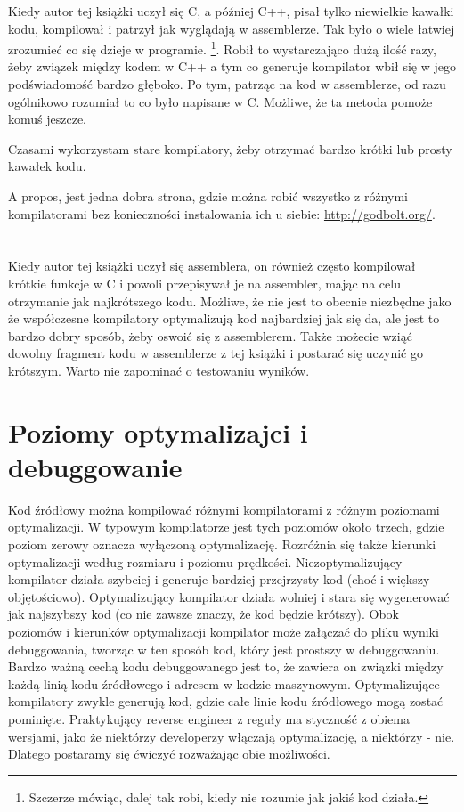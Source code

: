 
Kiedy autor tej książki uczył się C, a później C++, pisał tylko niewielkie kawałki kodu, kompilował i patrzył jak wyglądają w assemblerze. Tak było o wiele łatwiej zrozumieć co się dzieje w programie.%
\footnote{Szczerze mówiąc, dalej tak robi, kiedy nie rozumie jak jakiś kod działa.}.
Robił to wystarczająco dużą ilość razy, żeby związek między kodem w C++ a tym co generuje kompilator wbił się w jego podświadomość bardzo głęboko. Po tym, patrząc na kod w assemblerze, od razu ogólnikowo rozumiał to co było napisane w C. Możliwe, że ta metoda pomoże komuś jeszcze.


Czasami wykorzystam stare kompilatory, żeby otrzymać bardzo krótki lub prosty kawałek kodu.

A propos, jest jedna dobra strona, gdzie można robić wszystko z różnymi kompilatorami bez konieczności instalowania ich u siebie: \url{http://godbolt.org/}.

\section*{\Exercises}

Kiedy autor tej książki uczył się assemblera, on również często kompilował krótkie funkcje w C i powoli przepisywał je na assembler, mając na celu otrzymanie jak najkrótszego kodu. Możliwe, że nie jest to obecnie niezbędne jako że współczesne kompilatory optymalizują kod najbardziej jak się da, ale jest to bardzo dobry sposób, żeby oswoić się z assemblerem. Także możecie wziąć dowolny fragment kodu w assemblerze z tej książki i postarać się uczynić go krótszym. Warto nie zapominać o testowaniu wyników.

\section*{Poziomy optymalizajci i debuggowanie}

Kod źródłowy można kompilować różnymi kompilatorami z różnym poziomami optymalizacji. W typowym kompilatorze jest tych poziomów około trzech, gdzie poziom zerowy oznacza wyłączoną optymalizację. Rozróżnia się także kierunki optymalizacji według rozmiaru i poziomu prędkości. Niezoptymalizujący kompilator działa szybciej i generuje bardziej przejrzysty kod (choć i większy objętościowo). Optymalizujący kompilator działa wolniej i stara się wygenerować jak najszybszy kod (co nie zawsze znaczy, że kod będzie krótszy). Obok poziomów i kierunków optymalizacji kompilator może załączać do pliku wyniki debuggowania, tworząc w ten sposób kod, który jest prostszy w debuggowaniu. Bardzo ważną cechą kodu debuggowanego jest to, że zawiera on związki między każdą linią kodu źródłowego i adresem w kodzie maszynowym. Optymalizujące kompilatory zwykle generują kod, gdzie całe linie kodu źródłowego mogą zostać pominięte. Praktykujący reverse engineer z reguły ma styczność z obiema wersjami, jako że niektórzy developerzy włączają optymalizację, a niektórzy - nie. Dlatego postaramy się ćwiczyć rozważając obie możliwości.

